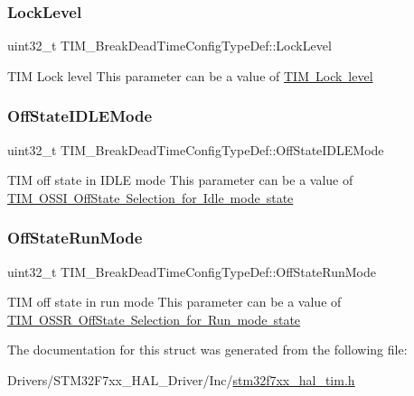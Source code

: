 \subsubsection{\texorpdfstring{LockLevel}{LockLevel}}
{\footnotesize\ttfamily uint32\+\_\+t T\+I\+M\+\_\+\+Break\+Dead\+Time\+Config\+Type\+Def\+::\+Lock\+Level}

T\+IM Lock level This parameter can be a value of \mbox{\hyperlink{group___t_i_m___lock__level}{T\+IM Lock level}} \mbox{\label{struct_t_i_m___break_dead_time_config_type_def_a49f39e31ac019b9b7a20751bfd01c6c4}} 
\subsubsection{\texorpdfstring{OffStateIDLEMode}{OffStateIDLEMode}}
{\footnotesize\ttfamily uint32\+\_\+t T\+I\+M\+\_\+\+Break\+Dead\+Time\+Config\+Type\+Def\+::\+Off\+State\+I\+D\+L\+E\+Mode}

T\+IM off state in I\+D\+LE mode This parameter can be a value of \mbox{\hyperlink{group___t_i_m___o_s_s_i___off___state___selection__for___idle__mode__state}{T\+IM O\+S\+SI Off\+State Selection for Idle mode state}} \mbox{\label{struct_t_i_m___break_dead_time_config_type_def_a5e97751b5e397414e2a5120eb5cef7c6}} 
\subsubsection{\texorpdfstring{OffStateRunMode}{OffStateRunMode}}
{\footnotesize\ttfamily uint32\+\_\+t T\+I\+M\+\_\+\+Break\+Dead\+Time\+Config\+Type\+Def\+::\+Off\+State\+Run\+Mode}

T\+IM off state in run mode This parameter can be a value of \mbox{\hyperlink{group___t_i_m___o_s_s_r___off___state___selection__for___run__mode__state}{T\+IM O\+S\+SR Off\+State Selection for Run mode state}} 

The documentation for this struct was generated from the following file\+:\begin{DoxyCompactItemize}
\item 
Drivers/\+S\+T\+M32\+F7xx\+\_\+\+H\+A\+L\+\_\+\+Driver/\+Inc/\mbox{\hyperlink{stm32f7xx__hal__tim_8h}{stm32f7xx\+\_\+hal\+\_\+tim.\+h}}\end{DoxyCompactItemize}
